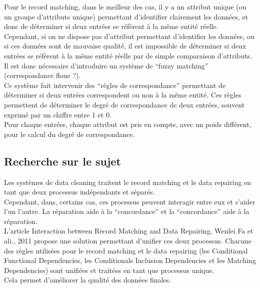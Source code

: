 Pour le record matching, dans le meilleur des cas, il y a un attribut unique (ou un groupe d’attributs unique) permettant d’identifier clairement les données, et donc de déterminer si deux entrées se réfèrent à la même entité réelle.\\
Cependant, si on ne dispose pas d’attribut permettant d’identifier les données, ou si ces données sont de mauvaise qualité, il est impossible de déterminer si deux entrées se réfèrent à la même entité réelle par de simple comparaison d’attributs.
Il est donc nécessaire d’introduire un système de “fuzzy matching” (correspondance floue ?).\\
Ce système fait intervenir des “règles de correspondance” permettant de déterminer si deux entrées correspondent ou non à la même entité. Ces règles permettent de déterminer le degré de correspondance de deux entrées, souvent exprimé par un chiffre entre 1 et 0.\\
Pour chaque entrées, chaque attribut est pris en compte, avec un poids différent, pour le calcul du degré de correspondance.

\subsection{Recherche sur le sujet}
Les systèmes de data cleaning traitent le record matching et le data repairing en tant que deux processus indépendants et séparés.\\
Cependant, dans, certains cas, ces processus peuvent interagir entre eux et s’aider l’un l’autre. La réparation aide à la “concordance” et la “concordance” aide à la réparation.\\
L’article Interaction between Record Matching and Data Repairing, Wenfei Fa et ali., 2011 propose une solution permettant d’unifier ces deux processus. Chacune des règles utilisées pour le record matching et le data repairing (les Conditional Functional Dependencies, les Conditionals Inclusion Dependencies et les Matching Dependencies) sont unifiées et traitées en tant que processus unique.\\
Cela permet d’améliorer la qualité des données finales.